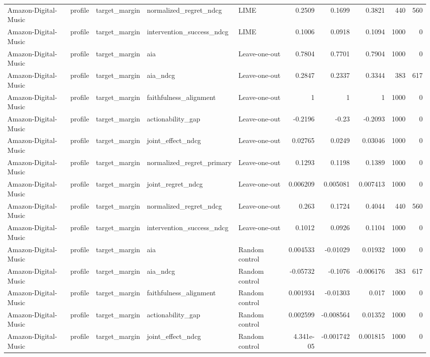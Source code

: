 \begin{table}[t]
\begin{tabular}{lllllrrrrr}
Amazon-Digital-Music & profile & target\_margin & normalized\_regret\_ndcg & LIME & 0.2509 & 0.1699 & 0.3821 & 440 & 560 \\
Amazon-Digital-Music & profile & target\_margin & intervention\_success\_ndcg & LIME & 0.1006 & 0.0918 & 0.1094 & 1000 & 0 \\
Amazon-Digital-Music & profile & target\_margin & aia & Leave-one-out & 0.7804 & 0.7701 & 0.7904 & 1000 & 0 \\
Amazon-Digital-Music & profile & target\_margin & aia\_ndcg & Leave-one-out & 0.2847 & 0.2337 & 0.3344 & 383 & 617 \\
Amazon-Digital-Music & profile & target\_margin & faithfulness\_alignment & Leave-one-out & 1 & 1 & 1 & 1000 & 0 \\
Amazon-Digital-Music & profile & target\_margin & actionability\_gap & Leave-one-out & -0.2196 & -0.23 & -0.2093 & 1000 & 0 \\
Amazon-Digital-Music & profile & target\_margin & joint\_effect\_ndcg & Leave-one-out & 0.02765 & 0.0249 & 0.03046 & 1000 & 0 \\
Amazon-Digital-Music & profile & target\_margin & normalized\_regret\_primary & Leave-one-out & 0.1293 & 0.1198 & 0.1389 & 1000 & 0 \\
Amazon-Digital-Music & profile & target\_margin & joint\_regret\_ndcg & Leave-one-out & 0.006209 & 0.005081 & 0.007413 & 1000 & 0 \\
Amazon-Digital-Music & profile & target\_margin & normalized\_regret\_ndcg & Leave-one-out & 0.263 & 0.1724 & 0.4044 & 440 & 560 \\
Amazon-Digital-Music & profile & target\_margin & intervention\_success\_ndcg & Leave-one-out & 0.1012 & 0.0926 & 0.1104 & 1000 & 0 \\
Amazon-Digital-Music & profile & target\_margin & aia & Random control & 0.004533 & -0.01029 & 0.01932 & 1000 & 0 \\
Amazon-Digital-Music & profile & target\_margin & aia\_ndcg & Random control & -0.05732 & -0.1076 & -0.006176 & 383 & 617 \\
Amazon-Digital-Music & profile & target\_margin & faithfulness\_alignment & Random control & 0.001934 & -0.01303 & 0.017 & 1000 & 0 \\
Amazon-Digital-Music & profile & target\_margin & actionability\_gap & Random control & 0.002599 & -0.008564 & 0.01352 & 1000 & 0 \\
Amazon-Digital-Music & profile & target\_margin & joint\_effect\_ndcg & Random control & 4.341e-05 & -0.001742 & 0.001815 & 1000 & 0 \\

\end{tabular}
\end{table}
